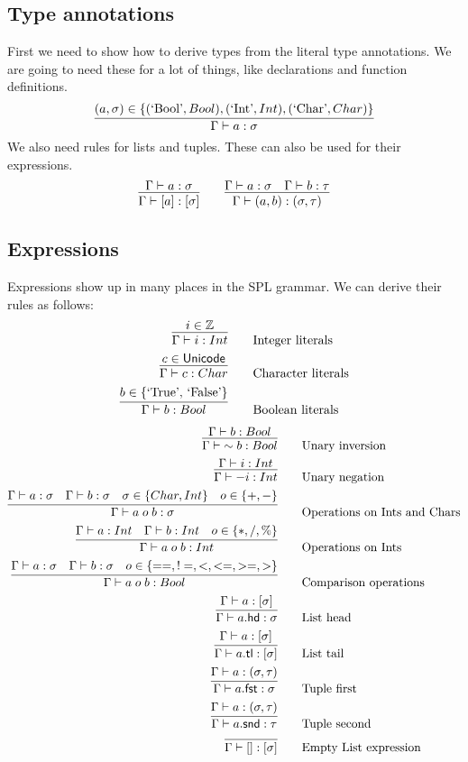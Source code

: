 \subsection{Type annotations}
First we need to show how to derive types from the literal type annotations.
We are going to need these for a lot of things, like declarations and function definitions.
\[
\infer{\Gamma \vdash a : \sigma}{(a, \sigma) \in \{(\mbox{`Bool'}, Bool), (\mbox{`Int'}, Int), (\mbox{`Char'}, Char)\} }
\]
We also need rules for lists and tuples.
These can also be used for their expressions.
\[
\infer{\Gamma \vdash [a] : [\sigma]}{\Gamma \vdash a : \sigma}\qquad
\infer{\Gamma \vdash (a, b) : (\sigma, \tau)}{\Gamma \vdash a : \sigma & \Gamma \vdash b : \tau}
\]

\subsection{Expressions}
Expressions show up in many places in the SPL grammar.
We can derive their rules as follows:
\begin{align*}
    \infer{\Gamma \vdash i : Int}{i \in \mathbb{Z}} &\qquad \mbox{Integer literals} \\
    \infer{\Gamma \vdash c : Char}{c \in \mathsf{Unicode}} &\qquad \mbox{Character literals} \\
    \infer{\Gamma \vdash b : Bool}{b \in \{\mbox{`True', `False'}\}} &\qquad \mbox{Boolean literals} \\
\end{align*}
\begin{align*}
    \infer{\Gamma \vdash\; \sim b : Bool}{\Gamma \vdash b : Bool} &\qquad \mbox{Unary inversion}\\
    \infer{\Gamma \vdash -i : Int}{\Gamma \vdash i : Int} &\qquad \mbox{Unary negation}\\
    \infer{\Gamma \vdash a\; o\; b : \sigma}{\Gamma \vdash a : \sigma & \Gamma \vdash b : \sigma & \sigma \in \{Char, Int\} & o \in \{+, -\}} &\qquad \mbox{Operations on Ints and Chars}\\
    \infer{\Gamma \vdash a\; o\; b : Int}{\Gamma \vdash a : Int & \Gamma \vdash b : Int & o \in \{*, /, \% \}} &\qquad \mbox{Operations on Ints}\\
    \infer{\Gamma \vdash a\; o\; b : Bool}{\Gamma \vdash a : \sigma & \Gamma \vdash b : \sigma & o \in \{==, !=, <, <=, >=, >\}} &\qquad \mbox{Comparison operations}\\
    \infer{\Gamma \vdash a\mathsf{.hd} : \sigma}{\Gamma \vdash a : [\sigma]} &\qquad \mbox{List head}\\
    \infer{\Gamma \vdash a\mathsf{.tl} : [\sigma]}{\Gamma \vdash a : [\sigma]} &\qquad \mbox{List tail}\\
    \infer{\Gamma \vdash a\mathsf{.fst} : \sigma}{\Gamma \vdash a : (\sigma, \tau)} &\qquad \mbox{Tuple first}\\
    \infer{\Gamma \vdash a\mathsf{.snd} : \tau}{\Gamma \vdash a : (\sigma, \tau)} &\qquad \mbox{Tuple second} \\
    \infer{\Gamma \vdash [] : [\sigma]}{} &\qquad \mbox{Empty List expression}
\end{align*}


